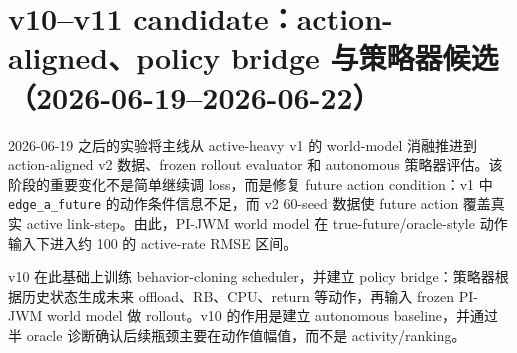 \documentclass[UTF8,a4paper,11pt]{ctexart}
\newcommand{\code}[1]{\texttt{#1}}
\begin{document}
\section{v10--v11 candidate：action-aligned、policy bridge 与策略器候选（2026-06-19--2026-06-22）}

2026-06-19 之后的实验将主线从 active-heavy v1 的 world-model 消融推进到 action-aligned v2 数据、frozen rollout evaluator 和 autonomous 策略器评估。该阶段的重要变化不是简单继续调 loss，而是修复 future action condition：v1 中 \code{edge\_a\_future} 的动作条件信息不足，而 v2 60-seed 数据使 future action 覆盖真实 active link-step。由此，PI-JWM world model 在 true-future/oracle-style 动作输入下进入约 100 的 active-rate RMSE 区间。

\begin{table}[H]
\centering
\small
{}
\caption{action-aligned v2 数据与 future action 条件诊断，来源为 \code{pi\_jwm\_v9\_expanded\_v2\_gpu\_20260619/experiment\_summary.md}。}
\end{table}

v10 在此基础上训练 behavior-cloning scheduler，并建立 policy bridge：策略器根据历史状态生成未来 offload、RB、CPU、return 等动作，再输入 frozen PI-JWM world model 做 rollout。v10 的作用是建立 autonomous baseline，并通过半 oracle 诊断确认后续瓶颈主要在动作值幅值，而不是 activity/ranking。
\end{document}
